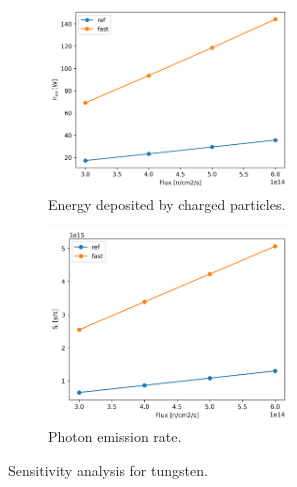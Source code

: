 \begin{figure}[htbp!] %
  \centering
  \begin{subfigure}[b]{0.49\textwidth}
    \centering
    \includegraphics[width=0.7\textwidth]{figures/fast-res74_hch}
    \caption{Energy deposited by charged particles.}
  \end{subfigure}
  \hfill
  \begin{subfigure}[b]{0.49\textwidth}
    \centering
    \includegraphics[width=0.7\textwidth]{figures/fast-res74_Si}
    \caption{Photon emission rate.}
  \end{subfigure}
  \hfill
  \caption{Sensitivity analysis for tungsten.}
  \label{fig:sens-w}
\end{figure}

